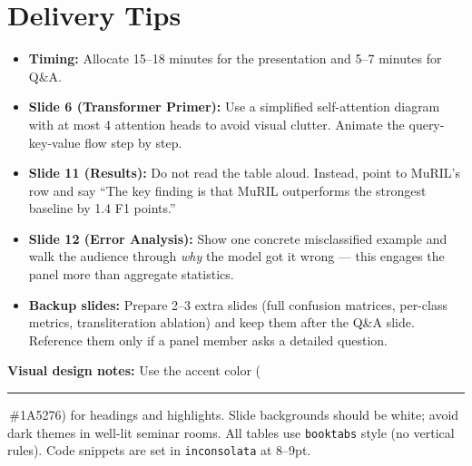 \section*{Delivery Tips}

\begin{itemize}[itemsep=4pt]
  \item \textbf{Timing:} Allocate 15--18 minutes for the presentation and 5--7 minutes for Q\&A.
  \item \textbf{Slide 6 (Transformer Primer):} Use a simplified self-attention diagram with at most 4 attention heads to avoid visual clutter. Animate the query-key-value flow step by step.
  \item \textbf{Slide 11 (Results):} Do not read the table aloud. Instead, point to MuRIL's row and say ``The key finding is that MuRIL outperforms the strongest baseline by 1.4 F1 points.''
  \item \textbf{Slide 12 (Error Analysis):} Show one concrete misclassified example and walk the audience through \emph{why} the model got it wrong — this engages the panel more than aggregate statistics.
  \item \textbf{Backup slides:} Prepare 2--3 extra slides (full confusion matrices, per-class metrics, transliteration ablation) and keep them after the Q\&A slide. Reference them only if a panel member asks a detailed question.
\end{itemize}

\vspace{12pt}
\begin{rvsummary}
\textbf{Visual design notes:} Use the accent color (\textcolor{accent}{\rule{8pt}{8pt}}\,\#1A5276) for headings and highlights. Slide backgrounds should be white; avoid dark themes in well-lit seminar rooms. All tables use \texttt{booktabs} style (no vertical rules). Code snippets are set in \texttt{inconsolata} at 8--9pt.
\end{rvsummary}

